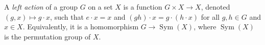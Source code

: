 
A \emph{left action} of a group $G$ on a set $X$ is a function $G\times X\to X$, denoted $(g,x)\mapsto g\cdot x$, such that $e\cdot x=x$ and $(gh)\cdot x=g\cdot(h\cdot x)$ for all $g,h\in G$ and $x\in X$. Equivalently, it is a homomorphism $G\to\operatorname{Sym}(X)$, where $\operatorname{Sym}(X)$ is the permutation group of $X$.
